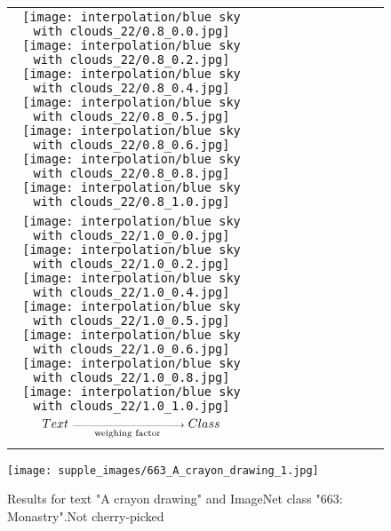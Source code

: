 \documentclass[10pt,twocolumn,letterpaper]{article}
\begin{document}
\begin{figure*}[tb!]
{\begin{tabular}{c c c c c c c c c c}
\tabularnewline
    \raisebox{0.1in}{\rotatebox{90}{\small \emph{$0.8$}
 }}
  \texttt{[image: interpolation/blue sky with clouds\_22/0.8\_0.0.jpg]}
  \texttt{[image: interpolation/blue sky with clouds\_22/0.8\_0.2.jpg]}
   \texttt{[image: interpolation/blue sky with clouds\_22/0.8\_0.4.jpg]}
  \texttt{[image: interpolation/blue sky with clouds\_22/0.8\_0.5.jpg]}
  \texttt{[image: interpolation/blue sky with clouds\_22/0.8\_0.6.jpg]}
  \texttt{[image: interpolation/blue sky with clouds\_22/0.8\_0.8.jpg]}
  \texttt{[image: interpolation/blue sky with clouds\_22/0.8\_1.0.jpg]}
\tabularnewline
    \raisebox{0.1in}{\rotatebox{90}{\small \emph{$1.0$}
 }}
  \texttt{[image: interpolation/blue sky with clouds\_22/1.0\_0.0.jpg]}
  \texttt{[image: interpolation/blue sky with clouds\_22/1.0\_0.2.jpg]}
   \texttt{[image: interpolation/blue sky with clouds\_22/1.0\_0.4.jpg]}
  \texttt{[image: interpolation/blue sky with clouds\_22/1.0\_0.5.jpg]}
  \texttt{[image: interpolation/blue sky with clouds\_22/1.0\_0.6.jpg]}
  \texttt{[image: interpolation/blue sky with clouds\_22/1.0\_0.8.jpg]}
  \texttt{[image: interpolation/blue sky with clouds\_22/1.0\_1.0.jpg]}
    \tabularnewline
        \raisebox{0.1in}{\rotatebox{90}{
 }}
 \hspace{0.5mm}
$\scriptsize{Text}\xrightarrow[\text{weighing factor}]{\hspace*{3cm}}\scriptsize{Class}$
  \tabularnewline
\vspace{2mm}
\vspace{-2\baselineskip}
\end{tabular}}
\vspace{-0.8cm}
\hspace{20pt}
\label{fig:glideablation14}
\vspace{-2mm}
\end{figure*}  \begin{figure*}[t!]
	\centering
			\texttt{[image: supple\_images/663\_A\_crayon\_drawing\_1.jpg]}
	\centering
	\caption{Results for text "A crayon drawing" and ImageNet class "663: Monastry".Not cherry-picked}
	\label{fig:t2im3243}
	\vskip -10pt
\end{figure*}
\end{document}
